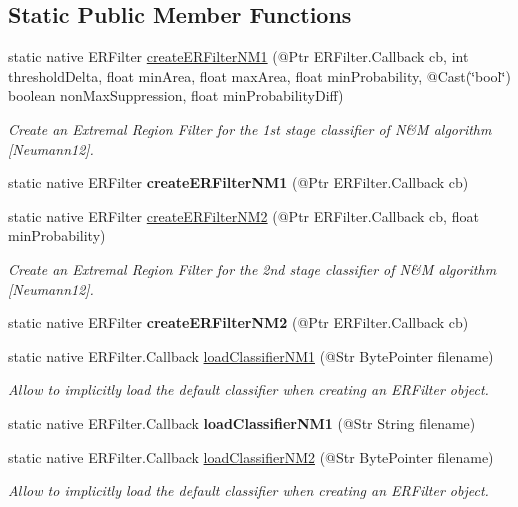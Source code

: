 \subsection*{Static Public Member Functions}
\begin{DoxyCompactItemize}
\item 
static native E\+R\+Filter \hyperlink{group__text__detect_ga0c01c194688152f569f28f7845cbfbaf}{create\+E\+R\+Filter\+N\+M1} (@Ptr E\+R\+Filter.\+Callback cb, int threshold\+Delta, float min\+Area, float max\+Area, float min\+Probability, @Cast(\char`\"{}bool\char`\"{}) boolean non\+Max\+Suppression, float min\+Probability\+Diff)
\begin{DoxyCompactList}\small\item\em Create an Extremal Region Filter for the 1st stage classifier of N\&M algorithm \mbox{[}Neumann12\mbox{]}. \end{DoxyCompactList}\item 
static native E\+R\+Filter {\bfseries create\+E\+R\+Filter\+N\+M1} (@Ptr E\+R\+Filter.\+Callback cb)
\item 
static native E\+R\+Filter \hyperlink{group__text__detect_ga941eba7519bae9c44d6cbd21d21ad26e}{create\+E\+R\+Filter\+N\+M2} (@Ptr E\+R\+Filter.\+Callback cb, float min\+Probability)
\begin{DoxyCompactList}\small\item\em Create an Extremal Region Filter for the 2nd stage classifier of N\&M algorithm \mbox{[}Neumann12\mbox{]}. \end{DoxyCompactList}\item 
static native E\+R\+Filter {\bfseries create\+E\+R\+Filter\+N\+M2} (@Ptr E\+R\+Filter.\+Callback cb)
\item 
static native E\+R\+Filter.\+Callback \hyperlink{group__text__detect_gaa43a04b9408663608d30f5bcdaadac16}{load\+Classifier\+N\+M1} (@Str Byte\+Pointer filename)
\begin{DoxyCompactList}\small\item\em Allow to implicitly load the default classifier when creating an E\+R\+Filter object. \end{DoxyCompactList}\item 
static native E\+R\+Filter.\+Callback {\bfseries load\+Classifier\+N\+M1} (@Str String filename)
\item 
static native E\+R\+Filter.\+Callback \hyperlink{group__text__detect_gaa41f7358b2e47c7e2b2831ad76410221}{load\+Classifier\+N\+M2} (@Str Byte\+Pointer filename)
\begin{DoxyCompactList}\small\item\em Allow to implicitly load the default classifier when creating an E\+R\+Filter object. \end{DoxyCompactList}\item 

\end{DoxyCompactItemize}
